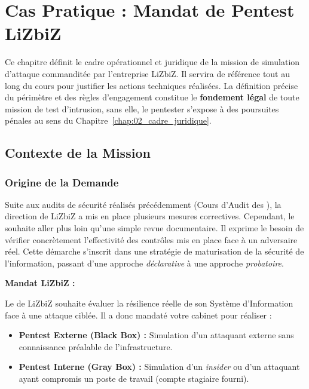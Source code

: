 
\chapter{Cas Pratique : Mandat de Pentest LiZbiZ}
\label{chap:mandat}

Ce chapitre définit le cadre opérationnel et juridique de la mission de simulation
d'attaque commanditée par l'entreprise LiZbiZ. Il servira de référence tout au long
du cours pour justifier les actions techniques réalisées. La définition précise du
périmètre et des règles d'engagement constitue le \textbf{fondement légal} de toute
mission de test d'intrusion, sans elle, le pentester s'expose à des poursuites
pénales au sens du Chapitre~\ref{chap:02_cadre_juridique}.

\section{Contexte de la Mission}
\label{sec:contexte}

\subsection{Origine de la Demande}

Suite aux audits de sécurité réalisés précédemment (Cours d'Audit des ),
la direction de LiZbiZ a mis en place plusieurs mesures correctives. Cependant, le
 souhaite aller plus loin qu'une simple revue documentaire. Il exprime
le besoin de vérifier concrètement l'effectivité des contrôles mis en place face
à un adversaire réel. Cette démarche s'inscrit dans une stratégie de maturisation
de la sécurité de l'information, passant d'une approche \textit{déclarative} à une
approche \textit{probatoire}.

\begin{boxlizbiz}
\textbf{Mandat LiZbiZ :}

Le  de LiZbiZ souhaite évaluer la résilience réelle de son Système
d'Information face à une attaque ciblée. Il a donc mandaté votre cabinet pour
réaliser :
\begin{itemize}
    \item \textbf{Pentest Externe (Black Box) :} Simulation d'un attaquant
          externe sans connaissance préalable de l'infrastructure.
    \item \textbf{Pentest Interne (Gray Box) :} Simulation d'un \textit{insider}
          ou d'un attaquant ayant compromis un poste de travail (compte
          \og{}stagiaire\fg{} fourni).
\end{itemize}
\end{boxlizbiz}

